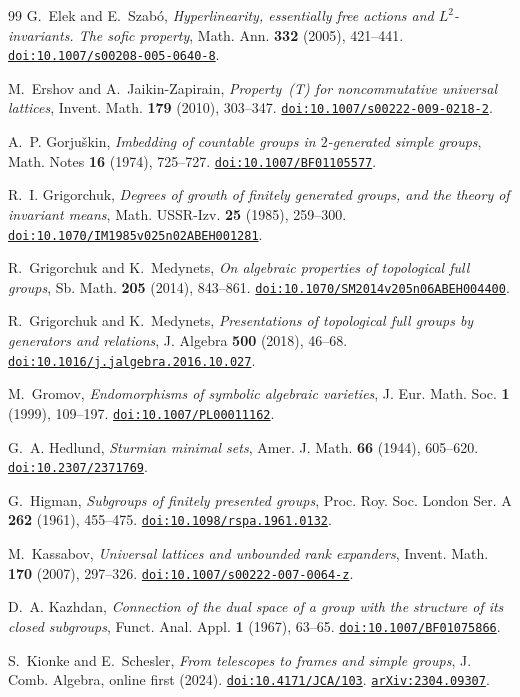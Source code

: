 \documentclass[11pt]{amsart}
\newcommand{\doi}[1]{\href{https://doi.org/#1}{\nolinkurl{doi:#1}}}
\newcommand{\arxiv}[1]{\href{https://arxiv.org/abs/#1}{\nolinkurl{arXiv:#1}}}
\begin{document}
\begin{thebibliography}{99}
G.~Elek and E.~Szab\'o, \emph{Hyperlinearity, essentially free actions and
$L^2$-invariants. The sofic property}, Math. Ann. \textbf{332} (2005),
421--441. \doi{10.1007/s00208-005-0640-8}.

M.~Ershov and A.~Jaikin-Zapirain,
\emph{Property~\textup{(T)} for noncommutative universal lattices},
Invent. Math. \textbf{179} (2010), 303--347.
\doi{10.1007/s00222-009-0218-2}.

A.~P. Gorju\v{s}kin, \emph{Imbedding of countable groups in
$2$-generated simple groups}, Math. Notes \textbf{16} (1974), 725--727.
\doi{10.1007/BF01105577}.

R.~I. Grigorchuk, \emph{Degrees of growth of finitely generated groups,
and the theory of invariant means}, Math. USSR-Izv. \textbf{25} (1985),
259--300. \doi{10.1070/IM1985v025n02ABEH001281}.

R.~Grigorchuk and K.~Medynets,
\emph{On algebraic properties of topological full groups},
Sb. Math. \textbf{205} (2014), 843--861.
\doi{10.1070/SM2014v205n06ABEH004400}.

R.~Grigorchuk and K.~Medynets,
\emph{Presentations of topological full groups by generators and
relations}, J. Algebra \textbf{500} (2018), 46--68.
\doi{10.1016/j.jalgebra.2016.10.027}.


M.~Gromov, \emph{Endomorphisms of symbolic algebraic varieties},
J. Eur. Math. Soc. \textbf{1} (1999), 109--197.
\doi{10.1007/PL00011162}.

G.~A. Hedlund, \emph{Sturmian minimal sets},
Amer. J. Math. \textbf{66} (1944), 605--620.
\doi{10.2307/2371769}.

G.~Higman, \emph{Subgroups of finitely presented groups},
Proc. Roy. Soc. London Ser. A \textbf{262} (1961), 455--475.
\doi{10.1098/rspa.1961.0132}.


M.~Kassabov, \emph{Universal lattices and unbounded rank expanders},
Invent. Math. \textbf{170} (2007), 297--326.
\doi{10.1007/s00222-007-0064-z}.

D.~A. Kazhdan, \emph{Connection of the dual space of a group with the
structure of its closed subgroups}, Funct. Anal. Appl. \textbf{1} (1967),
63--65. \doi{10.1007/BF01075866}.


S.~Kionke and E.~Schesler,
\emph{From telescopes to frames and simple groups},
J. Comb. Algebra, online first (2024). \doi{10.4171/JCA/103}.
\arxiv{2304.09307}.


\end{thebibliography}
\end{document}
